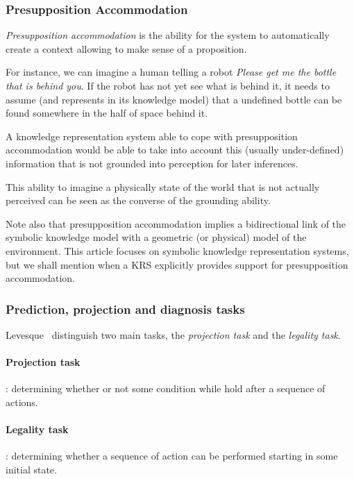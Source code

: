 \documentclass[a4paper, twocolumn]{article}
\begin{document}
\subsubsection{Presupposition Accommodation}
\label{sect|presupposition-accommodation}

\emph{Presupposition accommodation} is the ability for the system to
automatically create a context allowing to make sense of a proposition.

For instance, we can imagine a human telling a robot \emph{Please get me the
bottle that is behind you}. If the robot has not yet see what is behind it, it
needs to assume (and represents in its knowledge model) that a undefined bottle
can be found somewhere in the half of space behind it.

A knowledge representation system able to cope with presupposition
accommodation would be able to take into account this (usually under-defined)
information that is not grounded into perception for later inferences.

This ability to imagine a physically state of the world that is not actually
perceived can be seen as the converse of the grounding ability.

Note also that presupposition accommodation implies a bidirectional link of the
symbolic knowledge model with a geometric (or physical) model of the
environment. This article focuses on symbolic knowledge representation systems,
but we shall mention when a KRS explicitly provides support for presupposition
accommodation.

\subsubsection{Prediction, projection and diagnosis tasks}
\label{sect|prediction-projection}

Levesque~\cite{Levesque2008} distinguish two main tasks, the \emph{projection
task} and the \emph{legality task}.

\paragraph{Projection task}: determining whether or not some condition while
hold after a sequence of actions.

\paragraph{Legality task}: determining whether a sequence of action can be
performed starting in some initial state.
\end{document}
